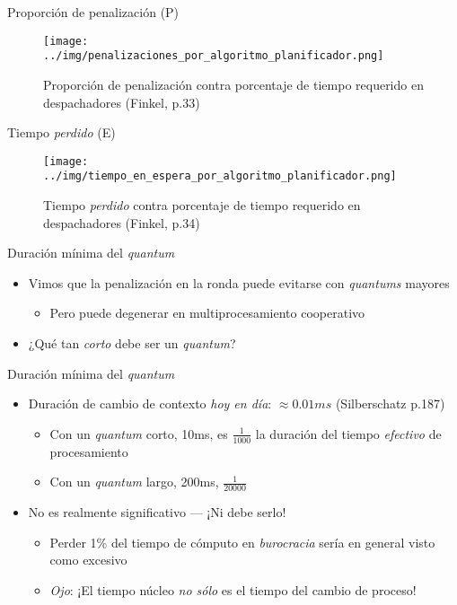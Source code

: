\documentclass[presentation]{beamer}
\begin{document}
\begin{frame}[label={sec:orgee6c3e7}]{Proporción de penalización (P)}
\begin{figure}[htbp]
\centering
\texttt{[image: ../img/penalizaciones\_por\_algoritmo\_planificador.png]}
\caption{\label{fig:org67df13a}Proporción de penalización contra porcentaje de tiempo requerido en despachadores (Finkel, p.33)}
\end{figure}
\end{frame}

\begin{frame}[label={sec:orgbe13aba}]{Tiempo \emph{perdido} (E)}
\begin{figure}[htbp]
\centering
\texttt{[image: ../img/tiempo\_en\_espera\_por\_algoritmo\_planificador.png]}
\caption{\label{fig:orgf168c7f}Tiempo \emph{perdido} contra porcentaje de tiempo requerido en despachadores (Finkel, p.34)}
\end{figure}
\end{frame}

\begin{frame}[label={sec:org8c7fd80}]{Duración mínima del \emph{quantum}}
\begin{itemize}
\item Vimos que la penalización en la ronda puede evitarse con \emph{quantums}
mayores
\begin{itemize}
\item Pero puede degenerar en multiprocesamiento cooperativo
\end{itemize}
\item ¿Qué tan \emph{corto} debe ser un \emph{quantum}?
\end{itemize}
\end{frame}

\begin{frame}[label={sec:org822ee85}]{Duración mínima del \emph{quantum}}
\begin{itemize}
\item Duración de cambio de contexto \emph{hoy en día}: \(\approx 0.01ms\)
(Silberschatz p.187)
\begin{itemize}
\item Con un \emph{quantum} corto, 10ms, es \(\frac{1}{1000}\) la duración del tiempo
\emph{efectivo} de procesamiento
\item Con un \emph{quantum} largo, 200ms, \(\frac{1}{20000}\)
\end{itemize}
\item No es realmente significativo — ¡Ni debe serlo!
\begin{itemize}
\item Perder 1\% del tiempo de cómputo en \emph{burocracia} sería en general
visto como excesivo
\item \emph{Ojo}: ¡El tiempo núcleo \emph{no sólo} es el tiempo del cambio de proceso!
\end{itemize}
\end{itemize}
\end{frame}
\end{document}
